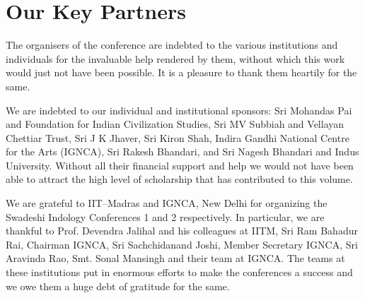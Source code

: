 
\chapter*{Our Key Partners}

The organisers of the conference are indebted to the various institutions and individuals for the invaluable help rendered by them, without which this work would just not have been possible. It is a pleasure to thank them heartily for the same.

We are indebted to our individual and institutional sponsors: Sri Mohandas Pai and Foundation for Indian Civilization Studies, Sri MV Subbiah and Vellayan Chettiar Trust, Sri J K Jhaver, Sri Kiron Shah, Indira Gandhi National Centre for the Arts (IGNCA), Sri Rakesh Bhandari, and Sri Nagesh Bhandari and Indus University. Without all their financial support and help we would not have been able to attract the high level of scholarship that has contributed to this volume.

We are grateful to IIT–Madras and IGNCA, New Delhi for organizing the Swadeshi Indology Conferences 1 and 2 respectively. In particular, we are thankful to Prof. Devendra Jalihal and his colleagues at IITM, Sri Ram Bahadur Rai, Chairman IGNCA, Sri Sachchidanand Joshi, Member Secretary IGNCA, Sri Aravinda Rao, Smt. Sonal Mansingh and their team at IGNCA. The teams at these institutions put in enormous efforts to make the conferences a success and we owe them a huge debt of gratitude for the same. 

